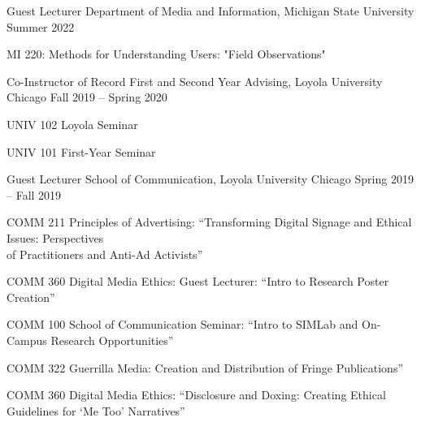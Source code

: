 
\begin{cventry}

  \cventry
    {Guest Lecturer} %
    {Department of Media and Information, Michigan State University} %
    {} %
    {Summer 2022} %
    {
      \begin{cvitems} %
        \item[] {MI 220: Methods for Understanding Users: "Field Observations"}
      \end{cvitems}
    }

  \cventry
    {Co-Instructor of Record} %
    {First and Second Year Advising, Loyola University Chicago} %
    {} %
    {Fall 2019 -- Spring 2020} %
    {
      \begin{cvitems} %
        \item[] {UNIV 102 Loyola Seminar}
        \item[] {UNIV 101 First-Year Seminar}
      \end{cvitems}
    }
    
  \cventry
    {Guest Lecturer} %
    {School of Communication, Loyola University Chicago} %
    {} %
    {Spring 2019 -- Fall 2019} %
    {
      \begin{cvitems} %
        \item[] {COMM 211 Principles of Advertising: “Transforming Digital Signage and Ethical Issues: Perspectives \\ of Practitioners and Anti-Ad Activists” }
        \item[] {COMM 360 Digital Media Ethics: Guest Lecturer: “Intro to Research Poster Creation”}
        \item[] {COMM 100 School of Communication Seminar: “Intro to SIMLab and On-Campus Research Opportunities”}
        \item[] {COMM 322 Guerrilla Media: Creation and Distribution of Fringe Publications”}
        \item[] {COMM 360 Digital Media Ethics: “Disclosure and Doxing: Creating Ethical Guidelines for ‘Me Too’ Narratives”}
      \end{cvitems}
    }    
\end{cventry}



